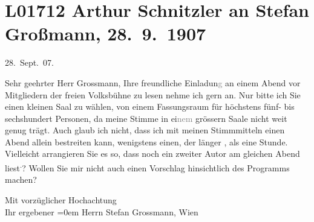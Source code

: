

\section[Arthur Schnitzler an Stefan Großmann, 28. 9. 1907]{L01712 Arthur Schnitzler an Stefan Großmann, 28. 9. 1907}
\nopagebreak{}
\rehead{ }\normalsize\beginnumbering{}
\toendnotes[C]{\smallbreak\pagebreak[2]}
\toendnotes[C]{\smallbreak}
\pstart
           \raggedleft{}{\pb}28. Sept. 07. \pend
           
\pstart{}Sehr geehrter Herr Grossmann,\pend\vspace{0.5em}
\pstart
           Ihre freundliche Einladun\textcolor{gray}{g} an einem Abend vor Mitgliedern der freien Volksbühne zu lesen nehme ich gern an. Nur
               bitte ich Sie einen kleinen Saal zu wählen, von einem Fassungsraum für höchstens
               fünf- bis sechshundert Personen, da meine Stimme in ei\textcolor{gray}{nem} grössern
               Saale nicht weit genug trägt. Auch glaub ich nicht, dass ich mit meinen Stimmmitteln
               einen Abend allein bestreiten kann, wenigstens einen, der länger \label{T_L01712-1v}\label{T_L01712-1}, als eine Stunde.
               Vielleicht arrangieren Sie es so, dass noch ein zweiter Autor am gleichen Abend liest\substVorne{}\textsuperscript{.}\substDazwischen{}?\substHinten{} Wollen Sie mir nicht auch einen Vorschlag hinsichtlich des Programms
               machen?\pend
           
\pstart
           Mit vorzüglicher Hochachtung{\\[\baselineskip]}Ihr ergebener\pend
           \leftskip=0em{}{\vspace{1\baselineskip}}
\pstart
           Herrn Stefan Grossmann, Wien\pend
           \endnumbering{}  
      